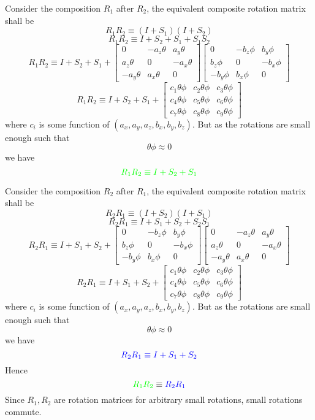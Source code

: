 \documentclass[12pt]{article}
\begin{document}
Consider the composition $R_1$ after $R_2$, the equivalent composite rotation matrix shall be
\[
  R_1 R_2 \equiv (I + S_1) (I + S_2)
\]
\[
  R_1 R_2 \equiv I + S_2 + S_1 + S_1S_2
\]
\[
  R_1 R_2 \equiv I + S_2 + S_1 +
  \begin{bmatrix}
    0 & -a_z\theta & a_y\theta\\
     a_z\theta & 0 & -a_x\theta \\
     -a_y\theta & a_x\theta & 0
  \end{bmatrix}
  \begin{bmatrix}
    0 & -b_z\phi & b_y\phi\\
     b_z\phi & 0 & -b_x\phi \\
     -b_y\phi & b_x\phi & 0
  \end{bmatrix}
\]
\[
  R_1 R_2 \equiv I + S_2 + S_1 +
  \begin{bmatrix}
    c_1\theta\phi & c_2\theta\phi & c_3\theta\phi \\
    c_4\theta\phi & c_5\theta\phi & c_6\theta\phi \\
    c_7\theta\phi & c_8\theta\phi & c_9\theta\phi
  \end{bmatrix}
\]
where $c_i$ is some function of $(a_x, a_y, a_z, b_x, b_y, b_z)$. But as the rotations are small enough such that
\[
  \theta\phi \approx 0
\]
we have
\[
  {\color{green} R_1 R_2 \equiv I + S_2 + S_1}
\]

Consider the composition $R_2$ after $R_1$, the equivalent composite rotation matrix shall be
\[
  R_2 R_1 \equiv (I + S_2) (I + S_1)
\]
\[
  R_2 R_1 \equiv I + S_1 + S_2 + S_2S_1
\]
\[
  R_2 R_1 \equiv I + S_1 + S_2 +
  \begin{bmatrix}
    0 & -b_z\phi & b_y\phi\\
     b_z\phi & 0 & -b_x\phi \\
     -b_y\phi & b_x\phi & 0
  \end{bmatrix}
  \begin{bmatrix}
    0 & -a_z\theta & a_y\theta\\
     a_z\theta & 0 & -a_x\theta \\
     -a_y\theta & a_x\theta & 0
  \end{bmatrix}
\]
\[
  R_2 R_1 \equiv I + S_1 + S_2 +
  \begin{bmatrix}
    c_1\theta\phi & c_2\theta\phi & c_3\theta\phi \\
    c_4\theta\phi & c_5\theta\phi & c_6\theta\phi \\
    c_7\theta\phi & c_8\theta\phi & c_9\theta\phi
  \end{bmatrix}
\]
where $c_i$ is some function of $(a_x, a_y, a_z, b_x, b_y, b_z)$. But as the rotations are small enough such that
\[
  \theta\phi \approx 0
\]
we have
\[
  {\color{blue} R_2 R_1 \equiv I + S_1 + S_2}
\]
Hence
\[
  {\color{green} R_1R_2} \equiv {\color{blue} R_2R_1}
\]
Since $R_1, R_2$ are rotation matrices for arbitrary small rotations, small rotations commute.
\pagebreak
\end{document}
